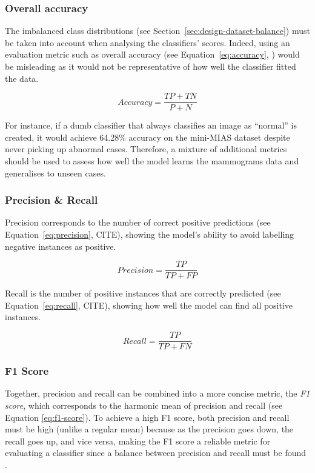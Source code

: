 \subsubsection{Overall accuracy}

The imbalanced class distributions (see Section~\ref{sec:design-dataset-balance}) must be taken into account when analysing the classifiers' scores. Indeed, using an evaluation metric such as overall accuracy (see Equation~\ref{eq:accuracy}, \cite{Falconi2019}) would be misleading as it would not be representative of how well the classifier fitted the data.

\begin{equation}
\label{eq:accuracy}
    Accuracy = \frac{TP + TN}{P + N}
\end{equation}

For instance, if a dumb classifier that always classifies an image as ``normal'' is created, it would achieve 64.28\% accuracy on the mini-MIAS dataset despite  never picking up abnormal cases. Therefore, a mixture of additional metrics should be used to assess how well the model learns the mammograms data and generalises to unseen cases.

\subsubsection{Precision \& Recall}

Precision corresponds to the number of correct positive predictions (see Equation~\ref{eq:precision}, CITE), showing the model's ability to avoid labelling negative instances as positive. 

\begin{equation}
\label{eq:precision}
    Precision = \frac{TP}{TP+FP}
\end{equation}

Recall is the number of positive instances that are correctly predicted (see Equation~\ref{eq:recall}, CITE), showing how well the model can find all positive instances.

\begin{equation}
\label{eq:recall}
    Recall = \frac{TP}{TP+FN}
\end{equation}

\subsubsection{F1 Score}

Together, precision and recall can be combined into a more concise metric, the \textit{F1 score}, which corresponds to the harmonic mean of precision and recall (see Equation \ref{eq:f1-score}). To achieve a high F1 score, both precision and recall must be high (unlike a regular mean) because as the precision goes down, the recall goes up, and vice versa, making the F1 score a reliable metric for evaluating a classifier since a balance between precision and recall must be found \citep{Geron2019}.

